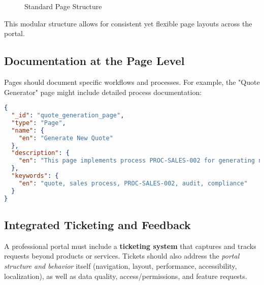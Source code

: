 \begin{figure}[h]
    \centering
    \caption{Standard Page Structure}
    \label{fig:page-structure}
\end{figure}

This modular structure allows for consistent yet flexible page layouts across the portal.

\subsection{Documentation at the Page Level}
\label{sec:page-documentation}

Pages should document specific workflows and processes. For example, the "Quote Generator" page might include detailed process documentation:

\begin{lstlisting}[language=JSON,caption={Page with Process Documentation},label={lst:process-page-docs}]
{
  "_id": "quote_generation_page",
  "type": "Page",
  "name": {
    "en": "Generate New Quote"
  },
  "description": {
    "en": "This page implements process PROC-SALES-002 for generating new customer quotes. The process requires completion of the customer information form and selection of products from the official catalog. All generated quotes must be approved by a sales manager before being sent to the customer. This process is audited quarterly under audit procedure AUD-Q-004."
  },
  "keywords": {
    "en": "quote, sales process, PROC-SALES-002, audit, compliance"
  }
}
\end{lstlisting}

\subsection{Integrated Ticketing and Feedback}
\label{sec:ticketing}

A professional portal must include a \textbf{ticketing system} that captures and tracks requests beyond products or services. Tickets should also address the \emph{portal structure and behavior} itself (navigation, layout, performance, accessibility, localization), as well as data quality, access/permissions, and feature requests.

